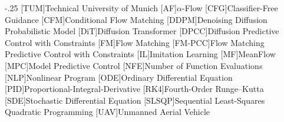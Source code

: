 \documentclass[headsepline,footsepline,footinclude=false,oneside,fontsize=11pt,paper=a4,listof=totoc,bibliography=totoc]{scrbook}
\newcommand{\printbibliography}{} %
\begin{document}
\begin{acronym}
  \itemsep-.25\baselineskip
  [TUM]{Technical University of Munich}
  [AF]{$\alpha$-Flow}
  [CFG]{Classifier-Free Guidance}
  [CFM]{Conditional Flow Matching}
  [DDPM]{Denoising Diffusion Probabilistic Model}
  [DiT]{Diffusion Transformer}
  [DPCC]{Diffusion Predictive Control with Constraints}
  [FM]{Flow Matching}
  [FM-PCC]{Flow Matching Predictive Control with Constraints}
  [IL]{Imitation Learning}
  [MF]{MeanFlow}
  [MPC]{Model Predictive Control}
  [NFE]{Number of Function Evaluations}
  [NLP]{Nonlinear Program}
  [ODE]{Ordinary Differential Equation}
  [PID]{Proportional-Integral-Derivative}
  [RK4]{Fourth-Order Runge--Kutta}
  [SDE]{Stochastic Differential Equation}
  [SLSQP]{Sequential Least-Squares Quadratic Programming}
  [UAV]{Unmanned Aerial Vehicle}
\end{acronym}

\listoffigures{}
\listoftables{}
\printbibliography{}
\end{document}

